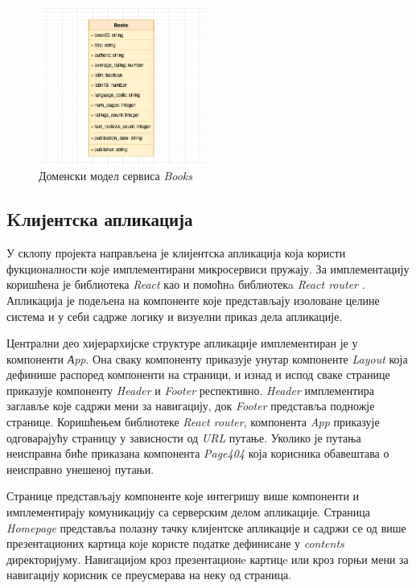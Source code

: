 \documentclass[12pt,oneside]{memoir}
\begin{document}
\begin{figure}[!ht]
  \centering
  \includegraphics[width=0.5\textwidth]{matfmaster/img/booksShema.png}
  \caption{Доменски модел сервиса \textit{Books}}
  \label{fig:booksShema}
\end{figure}
\newpage

\newpage


\subsection{Kлијентска апликација}

У склопу пројекта направљена је клијентска апликација која користи фукционалности које имплементирани микросервиси пружају. За имплементацију коришћена је библиотека \textit{React} као и помоћнa библиотекa \textit{React router} \cite{reactRouter}. Апликација је подељена на компоненте које представљају изоловане целине система и у себи садрже логику и визуелни приказ дела апликације.

Централни део хијерархијске структуре апликације имплементиран је у компоненти \textit{Аpp}. Она сваку компоненту приказује унутар компоненте \textit{Layout} која дефинише распоред компоненти на страници, и изнад и испод сваке странице приказује компоненту \textit{Header} и \textit{Footer} респективно. \textit{Header} имплементира заглавље које садржи мени за навигацију, док \textit{Footer} представља подножје странице. Коришћењем библиотеке \textit{React router}, компонента \textit{App} приказује одговарајућу страницу у зависности од \textit{URL} путање. Уколико је путања неисправна биће приказана компонента \textit{Page404} која корисника обавештава о неисправно унешеној путањи.  

Странице представљају компоненте које интегришу више компоненти и имплементирају комуникацију са серверским делом апликације. Страница \textit{Homepage} представља полазну тачку клијентске апликације и садржи се од више презентационих картица које користе податке дефинисане у \textit{contents} директоријуму. Навигацијом кроз презентационe картицe или кроз горњи мени за навигацију корисник се преусмерава на неку од страница. 
\end{document}
